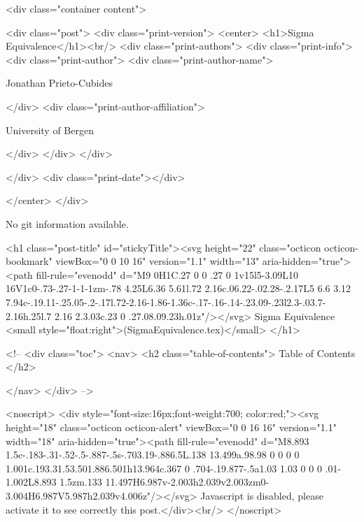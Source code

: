       <div class="container content">
        







<div class="post">
  <div class="print-version">
    <center>
      <h1>Sigma Equivalence</h1><br/>
        <div class="print-authors">
          <div class="print-info">
            <div class="print-author">
              <div class="print-author-name">
                
                  Jonathan Prieto-Cubides
                
              </div>
              <div class="print-author-affiliation">
                
                  University of Bergen
                
                </div>
            </div>
          </div>
          
          
        </div>
        <div class="print-date"></div>
        
        
    </center>
  </div>

  
  No git information available.
  

  <h1 class="post-title" id="stickyTitle"><svg height="22" class="octicon octicon-bookmark" viewBox="0 0 10 16" version="1.1" width="13" aria-hidden="true"><path fill-rule="evenodd" d="M9 0H1C.27 0 0 .27 0 1v15l5-3.09L10 16V1c0-.73-.27-1-1-1zm-.78 4.25L6.36 5.61l.72 2.16c.06.22-.02.28-.2.17L5 6.6 3.12 7.94c-.19.11-.25.05-.2-.17l.72-2.16-1.86-1.36c-.17-.16-.14-.23.09-.23l2.3-.03.7-2.16h.25l.7 2.16 2.3.03c.23 0 .27.08.09.23h.01z"/></svg> Sigma Equivalence <small style="float:right">(SigmaEquivalence.tex)</small>
  </h1>

  <!-- 
  <div class="toc">
    <nav>
    <h2 class="table-of-contents"> Table of Contents </h2>
      

    </nav>
  </div>
   -->

  <noscript>
  <div style="font-size:16px;font-weight:700; color:red;"><svg height="18" class="octicon octicon-alert" viewBox="0 0 16 16" version="1.1" width="18" aria-hidden="true"><path fill-rule="evenodd" d="M8.893 1.5c-.183-.31-.52-.5-.887-.5s-.703.19-.886.5L.138 13.499a.98.98 0 0 0 0 1.001c.193.31.53.501.886.501h13.964c.367 0 .704-.19.877-.5a1.03 1.03 0 0 0 .01-1.002L8.893 1.5zm.133 11.497H6.987v-2.003h2.039v2.003zm0-3.004H6.987V5.987h2.039v4.006z"/></svg> Javascript is disabled, please activate it to see correctly this post.</div><br/>
  </noscript>

